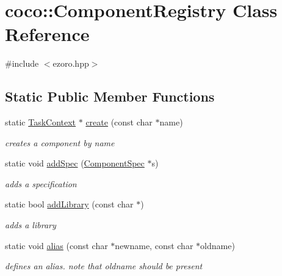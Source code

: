 \hypertarget{classcoco_1_1_component_registry}{\section{coco\-:\-:Component\-Registry Class Reference}
\label{classcoco_1_1_component_registry}
}


{\ttfamily \#include $<$ezoro.\-hpp$>$}

\subsection*{Static Public Member Functions}
\begin{DoxyCompactItemize}
\item 
\hypertarget{classcoco_1_1_component_registry_adf767122683bad2ca7f863be912589d3}{static \hyperlink{classcoco_1_1_task_context}{Task\-Context} $\ast$ \hyperlink{classcoco_1_1_component_registry_adf767122683bad2ca7f863be912589d3}{create} (const char $\ast$name)}\label{classcoco_1_1_component_registry_adf767122683bad2ca7f863be912589d3}

\begin{DoxyCompactList}\small\item\em creates a component by name \end{DoxyCompactList}\item 
\hypertarget{classcoco_1_1_component_registry_ac242dec3121dc83d32638c092541889f}{static void \hyperlink{classcoco_1_1_component_registry_ac242dec3121dc83d32638c092541889f}{add\-Spec} (\hyperlink{classcoco_1_1_component_spec}{Component\-Spec} $\ast$s)}\label{classcoco_1_1_component_registry_ac242dec3121dc83d32638c092541889f}

\begin{DoxyCompactList}\small\item\em adds a specification \end{DoxyCompactList}\item 
\hypertarget{classcoco_1_1_component_registry_ad665d9355353a110af2822f2f3ff7563}{static bool \hyperlink{classcoco_1_1_component_registry_ad665d9355353a110af2822f2f3ff7563}{add\-Library} (const char $\ast$)}\label{classcoco_1_1_component_registry_ad665d9355353a110af2822f2f3ff7563}

\begin{DoxyCompactList}\small\item\em adds a library \end{DoxyCompactList}\item 
\hypertarget{classcoco_1_1_component_registry_a2bdf8f5d4e827326baec571ee6e7e17c}{static void \hyperlink{classcoco_1_1_component_registry_a2bdf8f5d4e827326baec571ee6e7e17c}{alias} (const char $\ast$newname, const char $\ast$oldname)}\label{classcoco_1_1_component_registry_a2bdf8f5d4e827326baec571ee6e7e17c}

\begin{DoxyCompactList}\small\item\em defines an alias. note that oldname should be present \end{DoxyCompactList}\end{DoxyCompactItemize}

